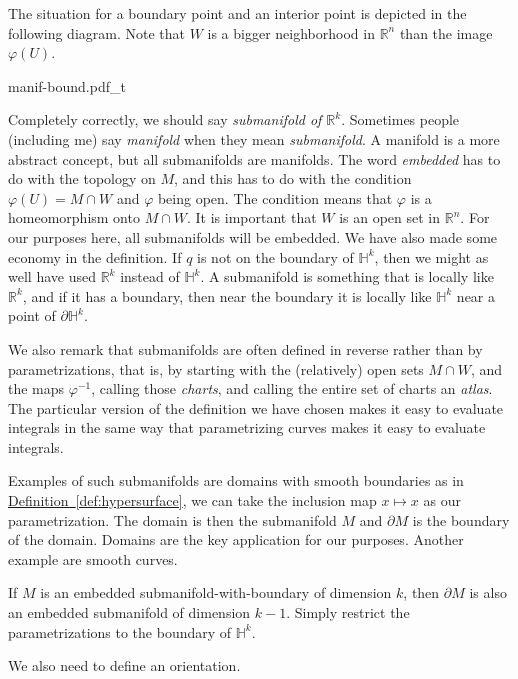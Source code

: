 \documentclass[12pt,openany]{book}
\newcommand{\R}{{\mathbb{R}}}
\newcommand{\bH}{{\mathbb{H}}}
\newcommand{\myindex}[1]{#1\index{#1}}
\theoremstyle{plain}
\theoremstyle{remark}
\theoremstyle{definition}
\newenvironment{myfig}{%
    \begin{center}
}{%
    \end{center}
}
\theoremstyle{exercise}
\theoremstyle{example}
\newcommand{\defnref}[1]{\hyperref[#1]{Definition~\ref*{#1}}}
\begin{document}
The situation for a boundary point and an interior point is depicted in the
following diagram.  Note that $W$ is a bigger neighborhood in $\R^n$ than
the image $\varphi(U)$.

\begin{myfig}
{manif-bound.pdf_t}
\end{myfig}

Completely correctly, we should say \emph{submanifold of $\R^k$}.
Sometimes people (including me)
say \emph{\myindex{manifold}} when they mean \emph{submanifold}.
A manifold is a more abstract concept, but
all submanifolds are manifolds.
The word \emph{embedded} has to do with the topology on $M$, and this
has to do with the condition $\varphi(U) = M \cap W$ and $\varphi$ being open.
The condition means that $\varphi$ is a homeomorphism onto $M \cap W$.
It is important that $W$ is an open set in $\R^n$.  For our
purposes here, all submanifolds will be embedded.
We have also made some economy in the definition.  If $q$ is not on the
boundary of $\bH^k$, then we might as well have used $\R^k$ instead of
$\bH^k$.
A submanifold is something that is locally like $\R^k$, and if it has a
boundary, then near the boundary it is locally like $\bH^k$ near a point
of $\partial \bH^k$.

We also remark that submanifolds are often defined in reverse rather than by
parametrizations, that is, by starting with the (relatively) open sets $M \cap W$,
and the maps $\varphi^{-1}$, calling those \emph{\myindex{charts}},
and calling the entire set of charts an \emph{\myindex{atlas}}.
The particular version of the definition we have chosen makes 
it easy to evaluate integrals in the same way that parametrizing curves
makes it easy to evaluate integrals.

Examples of such submanifolds are domains with smooth boundaries
as in \defnref{def:hypersurface}, we can take the inclusion map $x \mapsto
x$ as our parametrization.  The domain is then the submanifold $M$
and $\partial M$ is the boundary of the domain.
Domains are the key application for our purposes.
Another example are smooth curves.

If $M$ is an embedded submanifold-with-boundary
of dimension $k$, then $\partial M$ is also an embedded submanifold of dimension
$k-1$.  Simply restrict the parametrizations to the boundary of $\bH^k$.

We also need to define an orientation.
\end{document}
